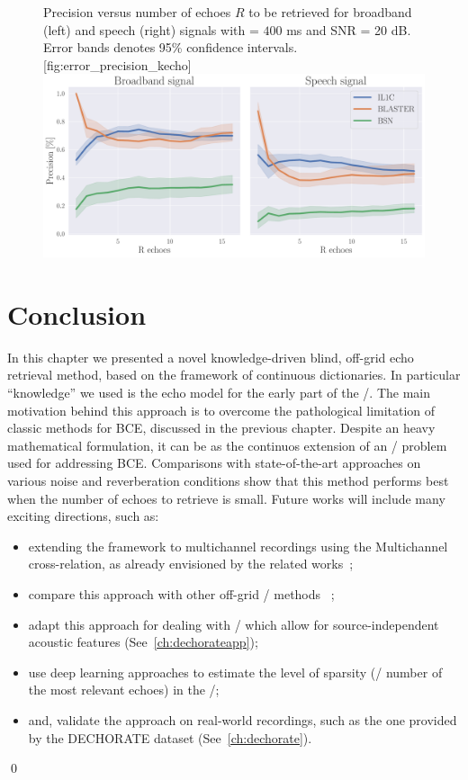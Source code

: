 \begin{figure}[t!]
    \begin{sidecaption}[]{
        Precision versus number of echoes $R$ to be retrieved for broadband (left) and speech (right) signals with \RT{} = $400$ ms and SNR = 20 dB.
        Error bands denotes 95\% confidence intervals.
    }[fig:error_precision_kecho]
    \centering
    \includegraphics[width=\linewidth]{figures/blaster/p_k-7_thr-2_bns_crocco_blaster-peak_withRechoes.pdf}
    \end{sidecaption}
\end{figure}

\section{Conclusion}
In this chapter we presented a novel knowledge-driven blind, off-grid echo retrieval method, based on the framework of continuous dictionaries.
In particular ``knowledge'' we used is the echo model for the early part of the \RIRs/.
The main motivation behind this approach is to overcome the pathological limitation of classic methods for \ac{BCE}, discussed in the previous chapter.
Despite an heavy mathematical formulation, it can be as the continuos extension of an \LASSO/ problem used for addressing \ac{BCE}.
Comparisons with state-of-the-art approaches on various noise and reverberation conditions show that this method performs best when the number of echoes to retrieve is small.
Future works will include many exciting directions, such as:
\begin{itemize}
    \item extending the framework to multichannel recordings using the Multichannel cross-relation, as already envisioned by the related works~;
    \item compare this approach with other off-grid \AER/ methods  ~;
    \item adapt this approach for dealing with \ReTF/ which allow for source-independent acoustic features (See~\cref{ch:dechorateapp});
    \item use deep learning approaches to estimate the level of sparsity (\aka/ number of the most relevant echoes) in the \RIRs/;
    \item and, validate the approach on real-world recordings, such as the one provided by the \ac{DECHORATE} dataset (See~\cref{ch:dechorate}).
\end{itemize}
\qed